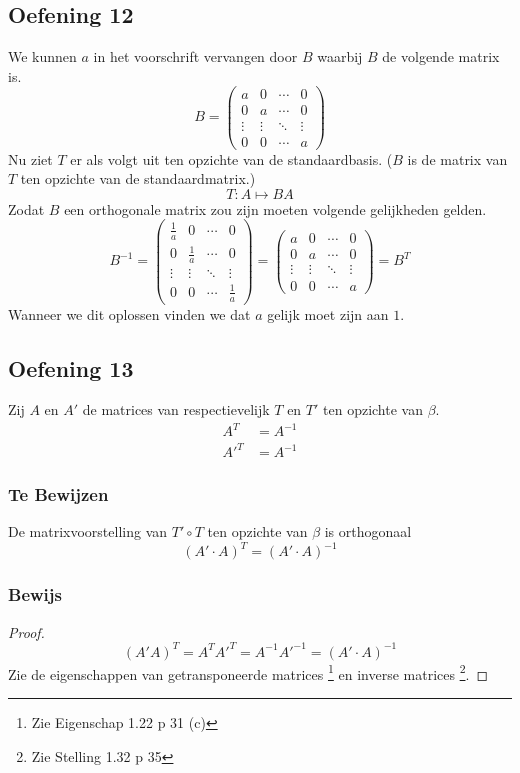 \documentclass[lineaire_algebra_oplossingen.tex]{subfiles}
\begin{document}
\subsection{Oefening 12}
We kunnen $a$ in het voorschrift vervangen door $B$ waarbij $B$ de volgende matrix is.
\[
B=
\begin{pmatrix}
a & 0 & \cdots & 0\\
0 & a & \cdots & 0\\
\vdots & \vdots& \ddots & \vdots\\
0 & 0 & \cdots & a
\end{pmatrix}
\]
Nu ziet $T$ er als volgt uit ten opzichte van de standaardbasis. ($B$ is de matrix van $T$ ten opzichte van de standaardmatrix.)
\[
T: A \mapsto BA
\]
Zodat $B$ een orthogonale matrix zou zijn moeten volgende gelijkheden gelden.
\[
B^{-1}=
\begin{pmatrix}
\frac{1}{a} & 0 & \cdots & 0\\
0 & \frac{1}{a} & \cdots & 0\\
\vdots & \vdots& \ddots & \vdots\\
0 & 0 & \cdots & \frac{1}{a}
\end{pmatrix}
=
\begin{pmatrix}
a & 0 & \cdots & 0\\
0 & a & \cdots & 0\\
\vdots & \vdots& \ddots & \vdots\\
0 & 0 & \cdots & a
\end{pmatrix}
= B^T
\]
Wanneer we dit oplossen vinden we dat $a$ gelijk moet zijn aan $1$.

\subsection*{Oefening 13}
Zij $A$ en $A'$ de matrices van respectievelijk $T$ en $T'$ ten opzichte van $\beta$.
\begin{align*}
A^T &= A^{-1} \\
A'^T &= A^{-1}
\end{align*}

\subsubsection*{Te Bewijzen}
De matrixvoorstelling van $T'\circ T$ ten opzichte van $\beta$ is orthogonaal
\[
(A'\cdot A)^T = (A'\cdot A)^{-1} 
\]

\subsubsection*{Bewijs}
\begin{proof}
\[
(A'A)^T = A^TA'^T = A^{-1}A'^{-1} = (A'\cdot A)^{-1} 
\]
Zie de eigenschappen van getransponeerde matrices \footnote{Zie Eigenschap 1.22 p 31 (c)} en inverse matrices \footnote{Zie Stelling 1.32 p 35}.
\end{proof}
\end{document}
